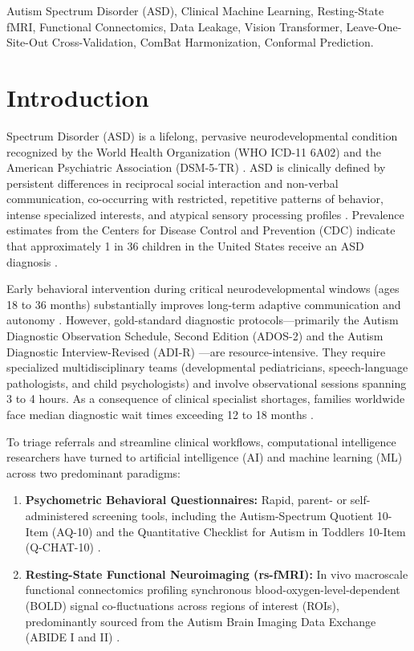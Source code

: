 \documentclass[journal]{IEEEtran}
\begin{document}
\begin{IEEEkeywords}
Autism Spectrum Disorder (ASD), Clinical Machine Learning, Resting-State fMRI, Functional Connectomics, Data Leakage, Vision Transformer, Leave-One-Site-Out Cross-Validation, ComBat Harmonization, Conformal Prediction.
\end{IEEEkeywords}

\IEEEpeerreviewmaketitle

\section{Introduction}
 Spectrum Disorder (ASD) is a lifelong, pervasive neurodevelopmental condition recognized by the World Health Organization (WHO ICD-11 6A02) and the American Psychiatric Association (DSM-5-TR) \cite{who2019icd, apa2022dsm}. ASD is clinically defined by persistent differences in reciprocal social interaction and non-verbal communication, co-occurring with restricted, repetitive patterns of behavior, intense specialized interests, and atypical sensory processing profiles \cite{lord2018autism}. Prevalence estimates from the Centers for Disease Control and Prevention (CDC) indicate that approximately 1 in 36 children in the United States receive an ASD diagnosis \cite{maenner2023prevalence}.

Early behavioral intervention during critical neurodevelopmental windows (ages 18 to 36 months) substantially improves long-term adaptive communication and autonomy \cite{coury2021increasing}. However, gold-standard diagnostic protocols—primarily the Autism Diagnostic Observation Schedule, Second Edition (ADOS-2) \cite{lord2012ados} and the Autism Diagnostic Interview-Revised (ADI-R) \cite{rutter2003adi}—are resource-intensive. They require specialized multidisciplinary teams (developmental pediatricians, speech-language pathologists, and child psychologists) and involve observational sessions spanning 3 to 4 hours. As a consequence of clinical specialist shortages, families worldwide face median diagnostic wait times exceeding 12 to 18 months \cite{coury2021increasing}.

To triage referrals and streamline clinical workflows, computational intelligence researchers have turned to artificial intelligence (AI) and machine learning (ML) across two predominant paradigms:
\begin{enumerate}
    \item \textbf{Psychometric Behavioral Questionnaires:} Rapid, parent- or self-administered screening tools, including the Autism-Spectrum Quotient 10-Item (AQ-10) \cite{allison2012toward} and the Quantitative Checklist for Autism in Toddlers 10-Item (Q-CHAT-10) \cite{auyeung2008quantitative}.
    \item \textbf{Resting-State Functional Neuroimaging (rs-fMRI):} In vivo macroscale functional connectomics profiling synchronous blood-oxygen-level-dependent (BOLD) signal co-fluctuations across regions of interest (ROIs), predominantly sourced from the Autism Brain Imaging Data Exchange (ABIDE I and II) \cite{dimartino2014abide}.
\end{enumerate}
\end{document}
